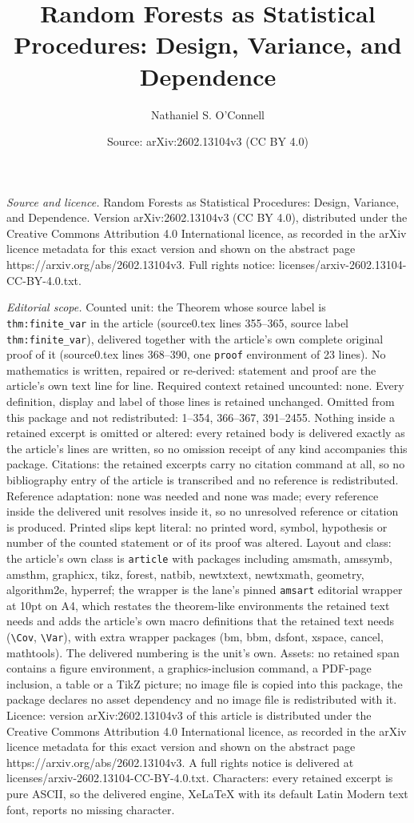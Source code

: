 \documentclass[10pt,a4paper]{amsart}
\title[Random Forests as Statistical Procedures: Design, Variance, ]{Random Forests as Statistical Procedures: Design, Variance, and Dependence}
\author{Nathaniel S. O'Connell}
\date{Source: arXiv:2602.13104v3 (CC BY 4.0)}
\begin{document}
\maketitle

\noindent\emph{Source and licence.} Random Forests as Statistical Procedures: Design, Variance, and Dependence. Version arXiv:2602.13104v3 (CC BY 4.0), distributed under the Creative Commons Attribution 4.0 International licence, as recorded in the arXiv licence metadata for this exact version and shown on the abstract page https://arxiv.org/abs/2602.13104v3. Full rights notice: licenses/arxiv-2602.13104-CC-BY-4.0.txt.\par\smallskip

\noindent\textit{Editorial scope.} Counted unit: the Theorem whose source label is \texttt{thm:finite\_var} in the article (source0.tex lines 355--365, source label \texttt{thm:finite\_var}), delivered together with the article's own complete original proof of it (source0.tex lines 368--390, one \texttt{proof} environment of 23 lines). No mathematics is written, repaired or re-derived: statement and proof are the article's own text line for line. Required context retained uncounted: none. Every definition, display and label of those lines is retained unchanged. Omitted from this package and not redistributed: 1--354, 366--367, 391--2455. Nothing inside a retained excerpt is omitted or altered: every retained body is delivered exactly as the article's lines are written, so no omission receipt of any kind accompanies this package. Citations: the retained excerpts carry no citation command at all, so no bibliography entry of the article is transcribed and no reference is redistributed. Reference adaptation: none was needed and none was made; every reference inside the delivered unit resolves inside it, so no unresolved reference or citation is produced. Printed slips kept literal: no printed word, symbol, hypothesis or number of the counted statement or of its proof was altered. Layout and class: the article's own class is \texttt{article} with packages including amsmath, amssymb, amsthm, graphicx, tikz, forest, natbib, newtxtext, newtxmath, geometry, algorithm2e, hyperref; the wrapper is the lane's pinned \texttt{amsart} editorial wrapper at 10pt on A4, which restates the theorem-like environments the retained text needs and adds the article's own macro definitions that the retained text needs (\texttt{\textbackslash Cov}, \texttt{\textbackslash Var}), with extra wrapper packages (bm, bbm, dsfont, xspace, cancel, mathtools). The delivered numbering is the unit's own. Assets: no retained span contains a figure environment, a graphics-inclusion command, a PDF-page inclusion, a table or a TikZ picture; no image file is copied into this package, the package declares no asset dependency and no image file is redistributed with it. Licence: version arXiv:2602.13104v3 of this article is distributed under the Creative Commons Attribution 4.0 International licence, as recorded in the arXiv licence metadata for this exact version and shown on the abstract page https://arxiv.org/abs/2602.13104v3. A full rights notice is delivered at licenses/arxiv-2602.13104-CC-BY-4.0.txt. Characters: every retained excerpt is pure ASCII, so the delivered engine, XeLaTeX with its default Latin Modern text font, reports no missing character.
\end{document}
